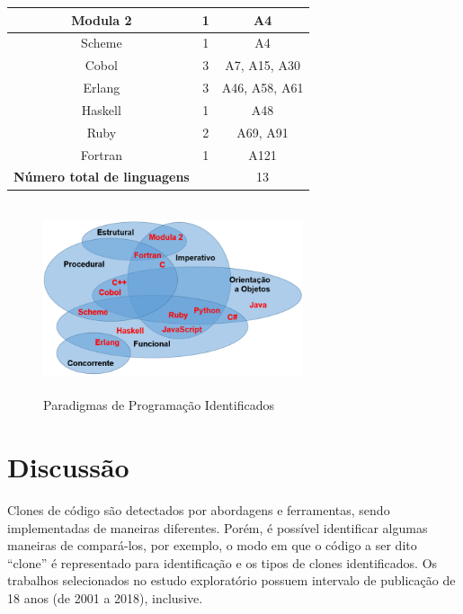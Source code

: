 \begin{table}[ht]
{\begin{tabular}{@{}ccc@{}}
			\\\hline
			Modula 2                 & 1          & A4
			\\\hline
			Scheme                   & 1          & A4
			\\\hline
			Cobol                    & 3          & A7, A15, A30
			\\\hline
			Erlang                   & 3          & A46, A58, A61
			\\\hline
			Haskell                  & 1          & A48
			\\\hline
			Ruby                     & 2          & A69, A91
			\\ \hline
			
			
			Fortran  &1  &A121  \\ \bottomrule \toprule
			
			\textbf{Número total de linguagens}  &  & 13
			\\\bottomrule
		\end{tabular}
	}
\end{table}

\begin{figure}
	\centering
	\scriptsize
	\includegraphics[height=2.2in, width=3in]{Linguagens.png}
	\caption{Paradigmas de Programação Identificados} 
	\label{paradigmas}
\end{figure}

\section{Discussão}
Clones de código são detectados por abordagens e ferramentas, sendo implementadas de maneiras diferentes. Porém, é possível identificar algumas maneiras de compará-los, por exemplo, o modo em que o código a ser dito ``clone'' é representado para identificação e os tipos de clones identificados. Os trabalhos selecionados no estudo exploratório possuem intervalo de publicação de 18 anos (de 2001 a 2018), inclusive.

